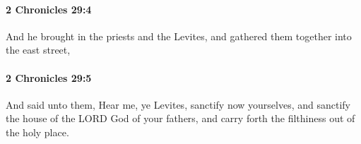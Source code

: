 		\paragraph{2 Chronicles 29:4} %
			\label{2CHRONICLES-29-4}

			And he brought in the priests and the Levites, and gathered them together into the east street,


		\paragraph{2 Chronicles 29:5} %
			\label{2CHRONICLES-29-5}

			And said unto them, Hear me, ye Levites, sanctify now yourselves, and sanctify the house of the LORD God of your fathers, and carry forth the filthiness out of the holy place.


